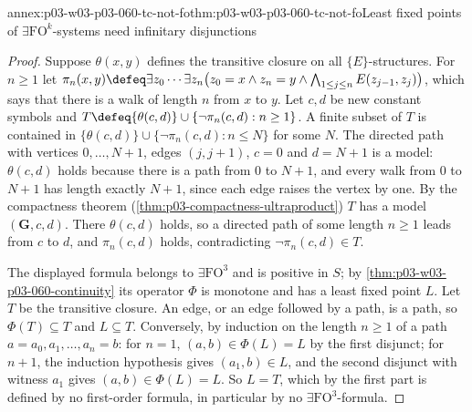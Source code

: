 \begin{annexitem}{annex:p03-w03-p03-060-tc-not-fo}{thm:p03-w03-p03-060-tc-not-fo}{Least fixed points of \(\exists\mathrm{FO}^k\)-systems need infinitary disjunctions}
\begin{proof}
Suppose \(\theta(x,y)\) defines the transitive closure on all
\(\{E\}\)-structures. For \(n\ge1\) let
\(\pi_n(x,y)\defeq\exists z_0\cdots\exists z_n\bigl(z_0=x\wedge z_n=y\wedge\bigwedge_{1\le j\le n}E(z_{j-1},z_j)\bigr)\),
which says that there is a walk of length \(n\) from \(x\) to \(y\). Let
\(c,d\) be new constant symbols and
\(T\defeq\{\theta(c,d)\}\cup\{\neg\pi_n(c,d):n\ge1\}\). A finite subset of
\(T\) is contained in \(\{\theta(c,d)\}\cup\{\neg\pi_n(c,d):n\le N\}\) for
some \(N\). The directed path with vertices \(0,\ldots,N+1\), edges
\((j,j+1)\), \(c=0\) and \(d=N+1\) is a model: \(\theta(c,d)\) holds because
there is a path from \(0\) to \(N+1\), and every walk from \(0\) to
\(N+1\) has length exactly \(N+1\), since each edge raises the vertex by
one. By the compactness theorem (\cref{thm:p03-compactness-ultraproduct})
\(T\) has a model \((\mathbf G,c,d)\). There \(\theta(c,d)\) holds, so a
directed path of some length \(n\ge1\) leads from \(c\) to \(d\), and
\(\pi_n(c,d)\) holds, contradicting \(\neg\pi_n(c,d)\in T\).

The displayed formula belongs to \(\exists\mathrm{FO}^3\) and is positive
in \(S\); by \cref{thm:p03-w03-p03-060-continuity} its operator \(\Phi\) is
monotone and has a least fixed point \(L\). Let \(T\) be the transitive
closure. An edge, or an edge followed by a path, is a path, so
\(\Phi(T)\subseteq T\) and \(L\subseteq T\). Conversely, by induction on the
length \(n\ge1\) of a path \(a=a_0,a_1,\ldots,a_n=b\): for \(n=1\),
\((a,b)\in\Phi(L)=L\) by the first disjunct; for \(n+1\), the induction
hypothesis gives \((a_1,b)\in L\), and the second disjunct with witness
\(a_1\) gives \((a,b)\in\Phi(L)=L\). So \(L=T\), which by the first part is
defined by no first-order formula, in particular by no
\(\exists\mathrm{FO}^3\)-formula.
\end{proof}
\end{annexitem}

